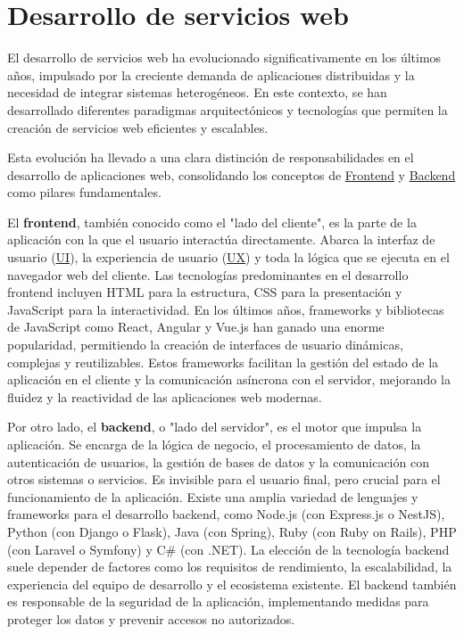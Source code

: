 \section{Desarrollo de servicios web}

El desarrollo de servicios web ha evolucionado significativamente en los últimos años, impulsado por la creciente demanda de aplicaciones distribuidas y la necesidad de integrar sistemas heterogéneos. En este contexto, se han desarrollado diferentes paradigmas arquitectónicos y tecnologías que permiten la creación de servicios web eficientes y escalables.

Esta evoluci\'{o}n ha llevado a una clara distinci\'{o}n de responsabilidades en el desarrollo de aplicaciones web, consolidando los conceptos de \hyperlink{frontend}{Frontend} y \hyperlink{backend}{Backend} como pilares fundamentales.

El \textbf{frontend}, tambi\'{e}n conocido como el "lado del cliente", es la parte de la aplicaci\'{o}n con la que el usuario interact\'{u}a directamente. Abarca la interfaz de usuario (\hyperlink{ui}{UI}), la experiencia de usuario (\hyperlink{ux}{UX}) y toda la l\'{o}gica que se ejecuta en el navegador web del cliente. Las tecnolog\'{i}as predominantes en el desarrollo frontend incluyen HTML para la estructura, CSS para la presentaci\'{o}n y JavaScript para la interactividad. 
\newline\newline
En los \'{u}ltimos a\~{n}os, frameworks y bibliotecas de JavaScript como React, Angular y Vue.js han ganado una enorme popularidad, permitiendo la creaci\'{o}n de interfaces de usuario din\'{a}micas, complejas y reutilizables. Estos frameworks facilitan la gesti\'{o}n del estado de la aplicaci\'{o}n en el cliente y la comunicaci\'{o}n as\'{i}ncrona con el servidor, mejorando la fluidez y la reactividad de las aplicaciones web modernas.

Por otro lado, el \textbf{backend}, o "lado del servidor", es el motor que impulsa la aplicaci\'{o}n. Se encarga de la l\'{o}gica de negocio, el procesamiento de datos, la autenticaci\'{o}n de usuarios, la gesti\'{o}n de bases de datos y la comunicaci\'{o}n con otros sistemas o servicios. Es invisible para el usuario final, pero crucial para el funcionamiento de la aplicaci\'{o}n. Existe una amplia variedad de lenguajes y frameworks para el desarrollo backend, como Node.js (con Express.js o NestJS), Python (con Django o Flask), Java (con Spring), Ruby (con Ruby on Rails), PHP (con Laravel o Symfony) y C\# (con .NET). La elecci\'{o}n de la tecnolog\'{i}a backend suele depender de factores como los requisitos de rendimiento, la escalabilidad, la experiencia del equipo de desarrollo y el ecosistema existente. El backend tambi\'{e}n es responsable de la seguridad de la aplicaci\'{o}n, implementando medidas para proteger los datos y prevenir accesos no autorizados.


